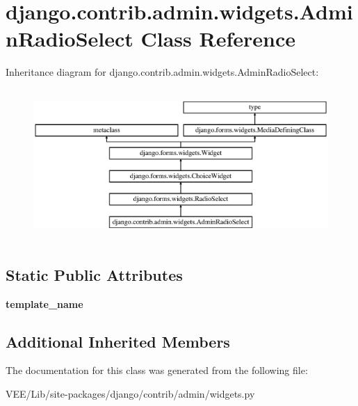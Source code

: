 \hypertarget{classdjango_1_1contrib_1_1admin_1_1widgets_1_1_admin_radio_select}{}\section{django.\+contrib.\+admin.\+widgets.\+Admin\+Radio\+Select Class Reference}
\label{classdjango_1_1contrib_1_1admin_1_1widgets_1_1_admin_radio_select}
Inheritance diagram for django.\+contrib.\+admin.\+widgets.\+Admin\+Radio\+Select\+:\begin{figure}[H]
\begin{center}
\leavevmode
\includegraphics[height=5.793103cm]{classdjango_1_1contrib_1_1admin_1_1widgets_1_1_admin_radio_select}
\end{center}
\end{figure}
\subsection*{Static Public Attributes}
\begin{DoxyCompactItemize}
\item 
\mbox{\label{classdjango_1_1contrib_1_1admin_1_1widgets_1_1_admin_radio_select_aaff5734ab8fbb57514c317eba1f7cdd1}} 
{\bfseries template\+\_\+name}
\end{DoxyCompactItemize}
\subsection*{Additional Inherited Members}


The documentation for this class was generated from the following file\+:\begin{DoxyCompactItemize}
\item 
V\+E\+E/\+Lib/site-\/packages/django/contrib/admin/widgets.\+py\end{DoxyCompactItemize}
